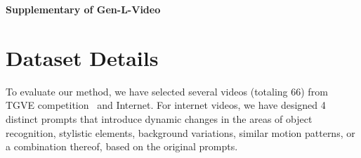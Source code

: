 \documentclass{article}
\begin{document}






\newpage
\setcounter{section}{0}
\renewcommand{\thesection}{\Roman{section}}
\begin{center}
	\textbf{\large Supplementary of Gen-L-Video }
\end{center}

\makeatletter
\section{Dataset Details}\label{sec:dataset details}
To evaluate our method, we have selected several videos (totaling 66) from TGVE competition~\cite{wu2022tune} and Internet. For internet videos, we have designed 4 distinct prompts that introduce dynamic changes in the areas of object recognition, stylistic elements, background variations, similar motion patterns, or a combination thereof, based on the original prompts.
\end{document}

